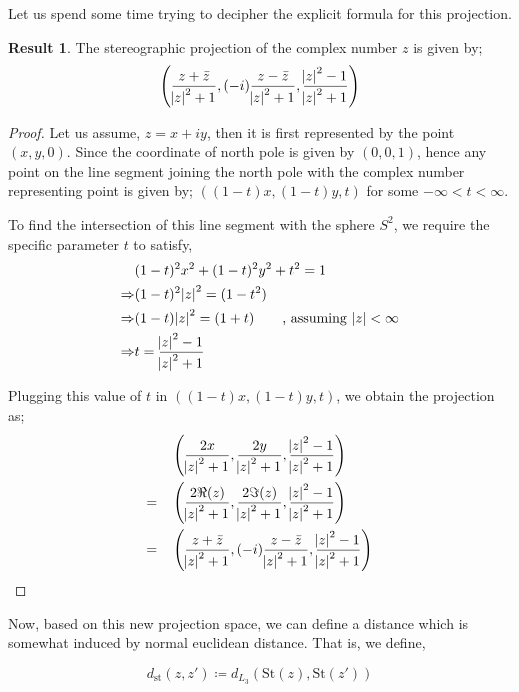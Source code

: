 \documentclass[12pt]{article}
\theoremstyle{definition}
\newtheorem{res}{Result}
\newenvironment{result}{
\begin{tcolorbox}[colback=green!5!white,colframe=green!75!black, parbox = false]\begin{res} }{\end{res}\end{tcolorbox} }
\begin{document}
Let us spend some time trying to decipher the explicit formula for this projection.

\begin{result}
    The stereographic projection of the complex number $z$ is given by;
    $$\left( \dfrac{z + \bar{z}}{\abs{z}^2 + 1}, (-i)\dfrac{z - \bar{z}}{\abs{z}^2 + 1}, \dfrac{\abs{z}^2 - 1}{\abs{z}^2 + 1} \right)$$
\end{result}

\begin{proof}
    Let us assume, $z = x + iy$, then it is first represented by the point $(x, y, 0)$. Since the coordinate of north pole is given by $(0, 0, 1)$, hence any point on the line segment joining the north pole with the complex number representing point is given by; $((1-t)x, (1-t)y, t)$ for some $-\infty < t < \infty$.
    
    To find the intersection of this line segment with the sphere $S^2$, we require the specific parameter $t$ to satisfy,
    \begin{align*}
        & (1-t)^2 x^2 + (1-t)^2y^2 + t^2 = 1\\
        \Rightarrow & (1-t)^2 \abs{z}^2 = (1 - t^2)\\
        \Rightarrow & (1-t) \abs{z}^2 = (1 + t) \qquad \text{, assuming } \abs{z} <\infty\\
        \Rightarrow & t = \dfrac{\abs{z}^2 - 1}{\abs{z}^2 + 1}
    \end{align*}
    
    Plugging this value of $t$ in $((1-t)x, (1-t)y, t)$, we obtain the projection as;
    \begin{align*}
        & \left( \dfrac{2x}{\abs{z}^2 + 1}, \dfrac{2y}{\abs{z}^2 + 1}, \dfrac{\abs{z}^2 - 1}{\abs{z}^2 + 1} \right)\\
        = \quad & \left( \dfrac{2\Re(z)}{\abs{z}^2 + 1}, \dfrac{2\Im(z)}{\abs{z}^2 + 1}, \dfrac{\abs{z}^2 - 1}{\abs{z}^2 + 1} \right)\\
        = \quad & \left( \dfrac{z + \bar{z}}{\abs{z}^2 + 1}, (-i)\dfrac{z - \bar{z}}{\abs{z}^2 + 1}, \dfrac{\abs{z}^2 - 1}{\abs{z}^2 + 1} \right)
    \end{align*}
\end{proof}


Now, based on this new projection space, we can define a distance which is somewhat induced by normal euclidean distance. That is, we define,

$$d_{\text{st}}(z, z') \coloneqq d_{L_3}(\text{St}(z), \text{St}(z'))$$
\end{document}
